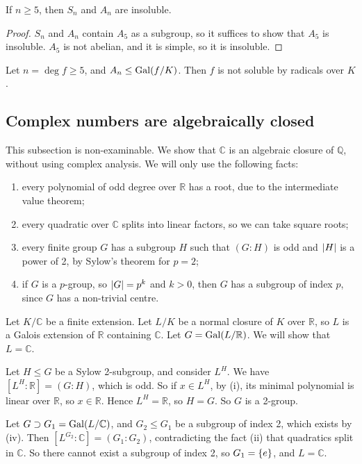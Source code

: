 \begin{proposition}
	If \( n \geq 5 \), then \( S_n \) and \( A_n \) are insoluble.
\end{proposition}
\begin{proof}
	\( S_n \) and \( A_n \) contain \( A_5 \) as a subgroup, so it suffices to show that \( A_5 \) is insoluble.
	\( A_5 \) is not abelian, and it is simple, so it is insoluble.
\end{proof}
\begin{corollary}
	Let \( n = \deg f \geq 5 \), and \( A_n \leq \operatorname{Gal}(f/K) \).
	Then \( f \) is not soluble by radicals over \( K \).
\end{corollary}

\subsection{Complex numbers are algebraically closed}
This subsection is non-examinable.
We show that \( \mathbb C \) is an algebraic closure of \( \mathbb Q \), without using complex analysis.
We will only use the following facts:
\begin{enumerate}
	\item every polynomial of odd degree over \( \mathbb R \) has a root, due to the intermediate value theorem;
	\item every quadratic over \( \mathbb C \) splits into linear factors, so we can take square roots;
	\item every finite group \( G \) has a subgroup \( H \) such that \( (G:H) \) is odd and \( \abs{H} \) is a power of 2, by Sylow's theorem for \( p = 2 \);
	\item if \( G \) is a \( p \)-group, so \( \abs{G} = p^k \) and \( k > 0 \), then \( G \) has a subgroup of index \( p \), since \( G \) has a non-trivial centre.
\end{enumerate}
Let \( K / \mathbb C \) be a finite extension.
Let \( L / K \) be a normal closure of \( K \) over \( \mathbb R \), so \( L \) is a Galois extension of \( \mathbb R \) containing \( \mathbb C \).
Let \( G = \operatorname{Gal}(L/\mathbb R) \).
We will show that \( L = \mathbb C \).

Let \( H \leq G \) be a Sylow 2-subgroup, and consider \( L^H \).
We have \( [L^H:\mathbb R] = (G:H) \), which is odd.
So if \( x \in L^H \), by (i), its minimal polynomial is linear over \( \mathbb R \), so \( x \in \mathbb R \).
Hence \( L^H = \mathbb R \), so \( H = G \).
So \( G \) is a 2-group.

Let \( G \supset G_1 = \operatorname{Gal}(L/\mathbb C) \), and \( G_2 \leq G_1 \) be a subgroup of index 2, which exists by (iv).
Then \( [L^{G_2}:\mathbb C] = (G_1 : G_2) \), contradicting the fact (ii) that quadratics split in \( \mathbb C \).
So there cannot exist a subgroup of index 2, so \( G_1 = \qty{e} \), and \( L = \mathbb C \).
